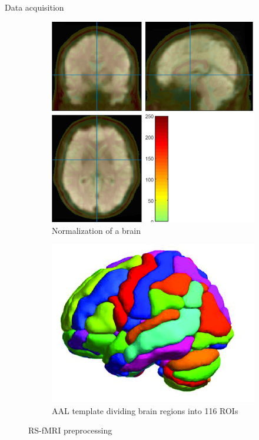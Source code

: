 \documentclass[final]{beamer}
\newlength{\colwidth}
\begin{document}
\begin{frame}[t]
\begin{columns}[t]
\begin{column}{\colwidth}
\begin{block}{Data acquisition}
\begin{figure}[ht]
    \centering
    \begin{subfigure}{0.45\textwidth}
        \centering
        \includegraphics[width=\linewidth]{images/Normalization.png}
        \caption{Normalization of a brain}
        \label{fig:sub1}
    \end{subfigure}%
    \hfill
    \begin{subfigure}{0.45\textwidth}
        \centering
        \includegraphics[width=\linewidth]{images/AAL.png}
        \caption{AAL template dividing brain regions into 116 ROIs}
        \label{fig:sub2}
    \end{subfigure}
    \caption{RS-fMRI preprocessing}
    \label{fig:both}
\end{figure}
  

\end{block}
\end{column}
\end{columns}
\end{frame}
\end{document}
